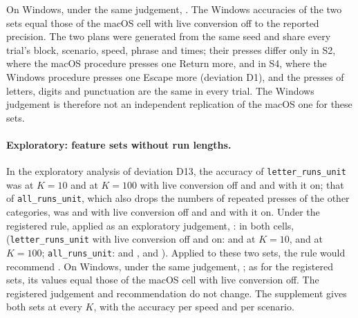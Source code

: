 On Windows, under the same judgement, . The Windows accuracies of the two sets equal those
of the macOS cell with live conversion off to the reported precision. The two plans were generated from the same seed
and share every trial's block, scenario, speed, phrase and times; their presses differ only in S2, where the macOS
procedure presses one Return more, and in S4, where the Windows procedure presses one Escape more (deviation D1), and
the presses of letters, digits and punctuation are the same in every trial. The Windows judgement is therefore not an
independent replication of the macOS one for these sets.

\paragraph{Exploratory: feature sets without run lengths.} In the exploratory analysis of deviation D13, the accuracy of
\texttt{letter\_runs\_unit} was  at $K = 10$ and
 at $K = 100$ with live conversion off and
 and 
with it on; that of \texttt{all\_runs\_unit}, which also drops the numbers of repeated presses of the other categories,
was  and 
with live conversion off and  and
 with it on. Under the registered rule, applied as an exploratory
judgement, : in both cells,  (\texttt{letter\_runs\_unit} with live conversion off
and on:  and
 at $K = 10$,
 and
 at $K = 100$; \texttt{all\_runs\_unit}:
 and ,
 and ).
Applied to these two sets, the rule would recommend . On Windows, under the same judgement,
; as for the registered sets, its values equal those of the macOS cell with live conversion off. The
registered judgement and recommendation do not change. The supplement gives both sets at every $K$, with the accuracy
per speed and per scenario.

